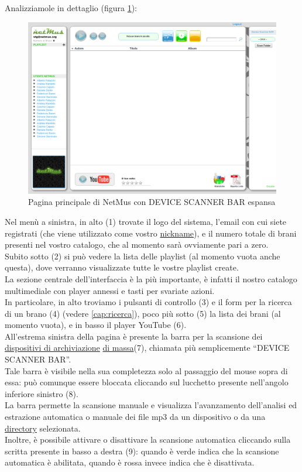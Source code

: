 Analizziamole in dettaglio (figura \ref{fig:appletbarAperta}):\\
\begin{figure}[!htbp]
  \centering
  \includegraphics[width=14cm]{img/MU/applet_bar_open.png}
\caption{Pagina principale di NetMus con DEVICE SCANNER BAR espansa}
\label{fig:appletbarAperta}
\end{figure} 

Nel men\`u a sinistra, in alto (1) trovate il logo del sistema,
l'email con cui siete registrati (che viene utilizzato come vostro
\underline{nickname}), e il numero totale di brani presenti nel vostro catalogo,
che al momento sar\`a ovviamente pari a zero.\\
Subito sotto (2) si pu\`o vedere la lista delle playlist (al momento vuota
anche questa), dove verranno visualizzate tutte le vostre playlist create.\\

La sezione centrale dell'interfaccia \`e la pi\`u importante, \`e infatti il
nostro catalogo multimediale con player annessi e tasti per svariate azioni.\\
In particolare, in alto troviamo i pulsanti di controllo (3) e il form per la
ricerca di un brano (4) (vedere \ref{cap:ricerca}), poco pi\`u sotto (5) la
lista dei brani (al momento vuota), e in basso il player YouTube (6).\\

All'estrema sinistra della pagina \`e presente la barra per la scansione
dei \underline{dispositivi di archiviazione} \underline{di massa}(7), chiamata
pi\`u semplicemente ``DEVICE SCANNER BAR''.\\ 
Tale barra \`e visibile nella sua completezza solo al passaggio del mouse sopra
di essa: pu\`o comunque essere bloccata cliccando sul lucchetto presente
nell'angolo inferiore sinistro (8).\\
La barra permette la scansione manuale e visualizza l'avanzamento dell'analisi
ed estrazione automatica o manuale dei file mp3 da un dispositivo o da una \underline{directory} selezionata.\\
Inoltre, \`e possibile attivare o disattivare la scansione automatica cliccando
sulla scritta presente in basso a destra (9): quando \`e verde indica che la
scansione automatica \`e abilitata, quando \`e rossa invece indica che \`e
disattivata.

